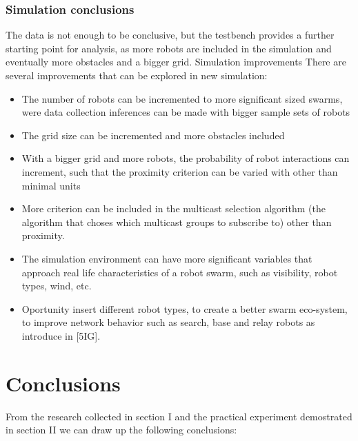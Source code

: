 \documentclass[journal]{IEEEtran}
\begin{document}
\subsubsection{Simulation conclusions}
The data is not enough to be conclusive, but the testbench provides a further starting point for analysis, as more robots are included in the simulation and eventually more obstacles and a bigger grid. 
Simulation improvements
There are several improvements that can be explored in new simulation:
\begin{itemize}
\item	The number of robots can be incremented to more significant sized swarms, were data collection inferences can be made with bigger sample sets of robots
\item	The grid size can be incremented and more obstacles included
\item	With a bigger grid and more robots, the probability of robot interactions can increment, such that the proximity criterion can be varied with other than minimal units
\item	More criterion can be included in the multicast selection algorithm (the algorithm that choses which multicast groups to subscribe to) other than proximity. 
\item	The simulation environment can have more significant variables that approach real life characteristics of a robot swarm, such as visibility, robot types, wind, etc.
\item	Oportunity insert different robot types, to create a better swarm eco-system, to improve network behavior such as search, base and relay robots as introduce in [5IG].
\end{itemize}

\section{Conclusions}

From the research collected in section I and the practical experiment demostrated in section II we can draw up the following conclusions:
\end{document}
